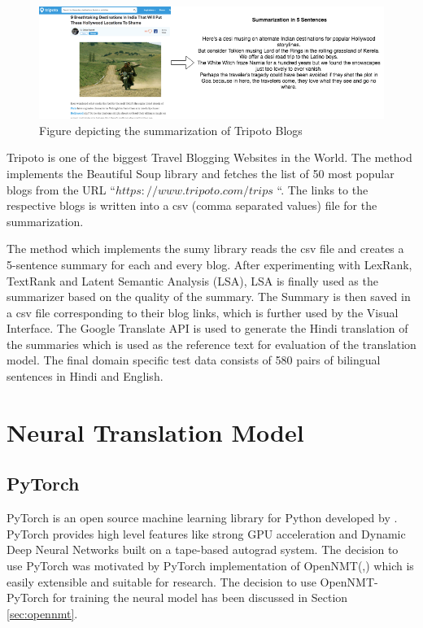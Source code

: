 \begin{figure}
\includegraphics[width=\textwidth]{figures/textsummary.png}
\caption{Figure depicting the summarization of Tripoto Blogs} \label{fig1}
\end{figure}
Tripoto is one of the biggest Travel Blogging Websites in the World. The method implements the Beautiful Soup library and fetches the list of 50 most popular blogs from the URL “$https://www.tripoto.com/trips$ “. The links to the respective blogs is written into a csv (comma separated values) file for the summarization.

The method which implements the sumy library reads the csv file and creates a 5-sentence summary for each and every blog. After experimenting with LexRank, TextRank and Latent Semantic Analysis (LSA), LSA is finally used as the summarizer based on the quality of the summary. The Summary is then saved in a csv file corresponding to their blog links, which is further used by the Visual Interface. The Google Translate API is used to generate the Hindi translation of the summaries which is used as the reference text for evaluation of the translation model. The final domain specific test data consists of 580 pairs of bilingual sentences in Hindi and English.

\section{Neural Translation Model}
\subsection{PyTorch}
PyTorch is an open source machine learning library for Python developed by \cite{paszke2017automatic}. PyTorch provides high level features like strong GPU acceleration and Dynamic Deep Neural Networks  built on a tape-based autograd system. The decision to use PyTorch was motivated by PyTorch implementation of OpenNMT(\citeauthor{opennmt},\citeyear{opennmt}) which is easily extensible and suitable for research. The decision to use OpenNMT-PyTorch for training the neural model has been discussed in Section \ref{sec:opennmt}.
